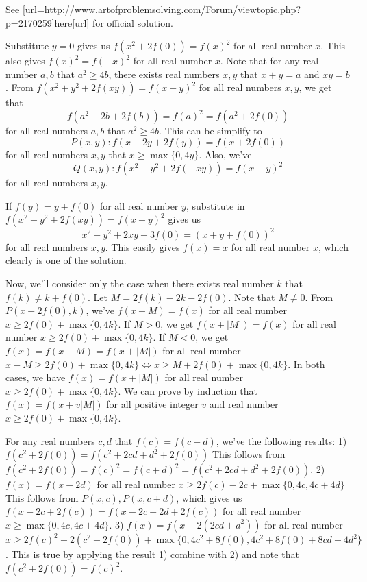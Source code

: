 


\begin{solution}
	See [url=http://www.artofproblemsolving.com/Forum/viewtopic.php?p=2170259]here[\/url] for official solution.
\end{solution}



\begin{solution}
	Substitute $y=0$ gives us $f(x^2+2f(0))=f(x)^2$ for all real number $x$. 
This also gives $f(x)^2=f(-x)^2$ for all real number $x$.
Note that for any real number $a,b$ that $a^2\geq 4b$, there exists real numbers $x,y$ that $x+y=a$ and $xy=b$.
From $f(x^2+y^2+2f(xy)) =f(x+y)^2$ for all real numbers $x,y$, we get that 
$$f(a^2-2b+2f(b))=f(a)^2=f(a^2+2f(0))$$ for all real numbers $a,b$ that $a^2\geq 4b$.
This can be simplify to 
$$P(x,y): f(x-2y+2f(y))=f(x+2f(0))$$ for all real numbers $x,y$ that $x\geq \max \{ 0,4y\}$.
Also, we've 
$$Q(x,y): f(x^2-y^2+2f(-xy))=f(x-y)^2$$ for all real numbers $x,y$.

If $f(y)=y+f(0)$ for all real number $y$, substitute in $f(x^2+y^2+2f(xy))=f(x+y)^2$ gives us 
$$x^2+y^2+2xy+3f(0)=(x+y+f(0))^2$$ for all real numbers $x,y$.
This easily gives $f(x)=x$ for all real number $x$, which clearly is one of the solution.

Now, we’ll consider only the case when there exists real number $k$ that $f(k)\neq k+f(0)$.
Let $M=2f(k)-2k-2f(0)$. Note that $M\neq 0$.
From $P(x-2f(0),k)$, we’ve $f(x+M)=f(x)$ for all real number $x\geq 2f(0)+\max \{ 0,4k\}$.
If $M>0$, we get $f(x+|M|)=f(x)$ for all real number $x\geq 2f(0)+\max \{ 0,4k\}$.
If $M<0$, we get $f(x)=f(x-M)=f(x+|M|)$ for all real number $x-M\geq 2f(0)+\max \{ 0,4k\}\iff x\geq M+2f(0)+\max \{ 0,4k\}$.
In both cases, we have $f(x)=f(x+|M|)$ for all real number $x\geq 2f(0)+\max \{ 0,4k\}$.
We can prove by induction that $f(x)=f(x+v|M|)$ for all positive integer $v$ and real number $x\geq 2f(0)+\max \{ 0,4k\}$.

For any real numbers $c,d$ that $f(c)=f(c+d)$, we’ve the following results:
1) $f(c^2+2f(0))=f(c^2+2cd+d^2+2f(0))$ 
This follows from $f(c^2+2f(0))= f(c)^2=f(c+d)^2=f(c^2+2cd+d^2+2f(0))$.
2) $f(x)=f(x-2d)$ for all real number $x\geq 2f(c)-2c+\max \{ 0,4c,4c+4d\}$
This follows from $P(x,c),P(x,c+d)$, which gives us $f(x-2c+2f(c))=f(x-2c-2d+2f(c))$ for all real number $x\geq \max \{ 0,4c,4c+4d\}$. 
3) $f(x)=f(x-2(2cd+d^2))$ for all real number $x\geq 2f(c)^2-2(c^2+2f(0))+\max \{ 0,4c^2+8f(0),4c^2+8f(0)+8cd+4d^2\}$.
This is true by applying the result 1) combine with 2) and note that $f(c^2+2f(0))=f(c)^2$.


\end{solution}
